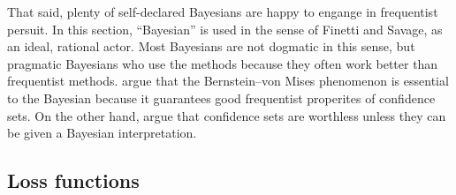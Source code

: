That said, plenty of self-declared Bayesians are happy to engange
in frequentist persuit. In this section, ``Bayesian'' is used in
the sense of Finetti and Savage, as an ideal, rational actor. Most
Bayesians are not dogmatic in this sense, but pragmatic Bayesians
who use the methods because they often work better than frequentist
methods. \cite{Gelman2013-ib} argue that the Bernstein--von Mises
phenomenon is essential to the Bayesian because it guarantees good
frequentist properites of confidence sets. On the other hand, \cite{Morey2016-ry}
argue that confidence sets are worthless unless they can be given
a Bayesian interpretation. 

\subsection{Loss functions}

